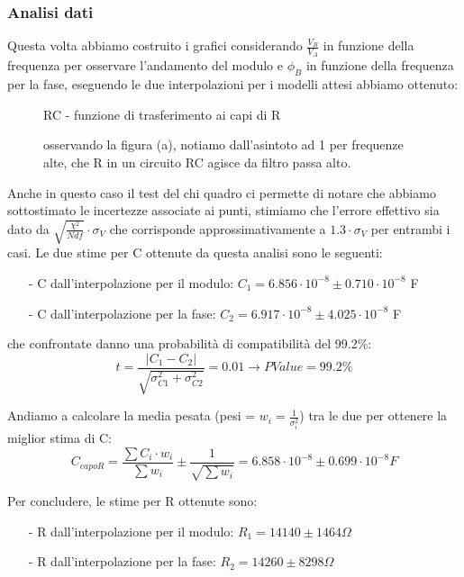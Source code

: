 \documentclass{article}
\theoremstyle{definition}
\begin{document}
\subsubsection*{Analisi dati}
Questa volta abbiamo costruito i grafici considerando \(\frac{V_{B}}{ V_{A}}\) in funzione della frequenza per osservare l'andamento del modulo e \(\phi_{B}\) in funzione della frequenza per la fase, eseguendo le due interpolazioni per i modelli attesi abbiamo ottenuto:\\


\begin{figure}[!h]
\caption{RC - funzione di trasferimento ai capi di R}
\caption*{osservando la figura (a), notiamo dall'asintoto ad 1 per frequenze alte, che R in un circuito RC agisce da filtro passa alto.}
\label{fig:RC_su_R}
\end{figure}

\noindent Anche in questo caso il test del chi quadro ci permette di notare che abbiamo sottostimato le incertezze associate ai punti, stimiamo che l'errore effettivo sia dato da \(\sqrt{\frac{\chi^{2}}{Ndf}} \cdot \sigma_{V}\) che corrisponde approssimativamente a \(1.3 \cdot \sigma_{V}\) per entrambi i casi.
Le due stime per C ottenute da questa analisi sono le seguenti:

\begin{enumerate}
    \item[-] C dall'interpolazione per il modulo: \(C_{1} = 6.856 \cdot 10^{-8} \pm 0.710 \cdot 10^{-8}\) F
    \item[-] C dall'interpolazione per la fase: \(C_{2} = 6.917 \cdot 10^{-8} \pm 4.025 \cdot 10^{-8}\) F
\end{enumerate}
\noindent che confrontate danno una probabilità di compatibilità del 99.2\%:
\[t = \frac{\left| C_{1} - C_{2}\right|}{\sqrt{\sigma^{2}_{C1} + \sigma^{2}_{C2}}} = 0.01 \rightarrow PValue = 99.2\%\]

\noindent Andiamo a calcolare la media pesata (pesi = \(w_{i} = \frac{1}{\sigma^{2}_{i}}\)) tra le due per ottenere la miglior stima di C: 
\[C_{capoR} = \frac{\sum{C_{i} \cdot w_{i}}}{\sum{w_{i}}}\pm \frac{1}{\sqrt{\sum{w_{i}}}} =  6.858\cdot 10^{-8} \pm 0.699 \cdot 10^{-8} F\]

\noindent Per concludere, le stime per R ottenute sono: 
\begin{enumerate}
    \item[-] R dall'interpolazione per il modulo: \(R_{1} = 14140 \pm 1464 \Omega\)
    \item[-] R dall'interpolazione per la fase: \(R_{2} = 14260 \pm 8298 \Omega \)
\end{enumerate}
\end{document}
